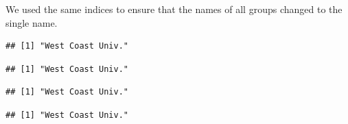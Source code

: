 \documentclass[
]{article}
\newenvironment{Shaded}{\begin{snugshade}}{\end{snugshade}}
\newcommand{\DecValTok}[1]{\textcolor[rgb]{0.00,0.00,0.81}{#1}}
\newcommand{\NormalTok}[1]{#1}
\newcommand{\OperatorTok}[1]{\textcolor[rgb]{0.81,0.36,0.00}{\textbf{#1}}}
\begin{document}
We used the same indices to ensure that the names of all groups changed
to the single name.

\begin{Shaded}
\end{Shaded}

\begin{verbatim}
## [1] "West Coast Univ."
\end{verbatim}

\begin{Shaded}
\end{Shaded}

\begin{verbatim}
## [1] "West Coast Univ."
\end{verbatim}

\begin{Shaded}
\end{Shaded}

\begin{verbatim}
## [1] "West Coast Univ."
\end{verbatim}

\begin{Shaded}
\end{Shaded}

\begin{verbatim}
## [1] "West Coast Univ."
\end{verbatim}

\begin{Shaded}
\end{Shaded}
\end{document}
